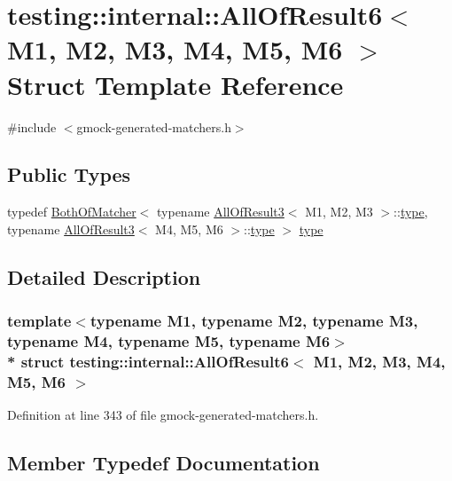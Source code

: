 \hypertarget{structtesting_1_1internal_1_1_all_of_result6}{}\section{testing\+:\+:internal\+:\+:All\+Of\+Result6$<$ M1, M2, M3, M4, M5, M6 $>$ Struct Template Reference}
\label{structtesting_1_1internal_1_1_all_of_result6}


{\ttfamily \#include $<$gmock-\/generated-\/matchers.\+h$>$}

\subsection*{Public Types}
\begin{DoxyCompactItemize}
\item 
typedef \hyperlink{classtesting_1_1internal_1_1_both_of_matcher}{Both\+Of\+Matcher}$<$ typename \hyperlink{structtesting_1_1internal_1_1_all_of_result3}{All\+Of\+Result3}$<$ M1, M2, M3 $>$\+::\hyperlink{structtesting_1_1internal_1_1_all_of_result6_a5385655911ce2c1d3fccd802c1754139}{type}, typename \hyperlink{structtesting_1_1internal_1_1_all_of_result3}{All\+Of\+Result3}$<$ M4, M5, M6 $>$\+::\hyperlink{structtesting_1_1internal_1_1_all_of_result6_a5385655911ce2c1d3fccd802c1754139}{type} $>$ \hyperlink{structtesting_1_1internal_1_1_all_of_result6_a5385655911ce2c1d3fccd802c1754139}{type}
\end{DoxyCompactItemize}


\subsection{Detailed Description}
\subsubsection*{template$<$typename M1, typename M2, typename M3, typename M4, typename M5, typename M6$>$\\*
struct testing\+::internal\+::\+All\+Of\+Result6$<$ M1, M2, M3, M4, M5, M6 $>$}



Definition at line 343 of file gmock-\/generated-\/matchers.\+h.



\subsection{Member Typedef Documentation}
